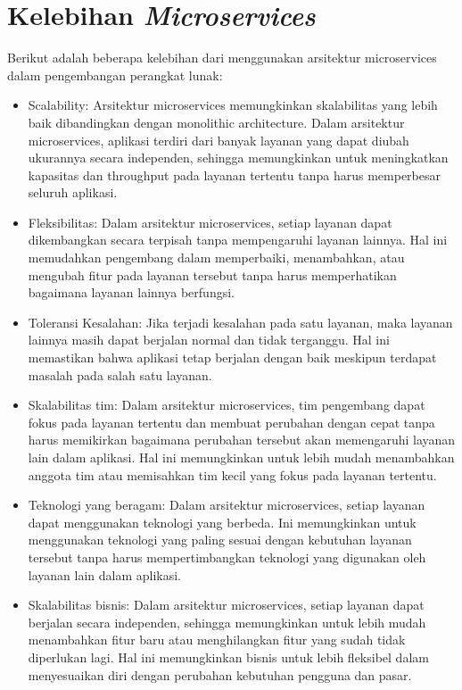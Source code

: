 	
	\section{Kelebihan \textit{Microservices}}
	Berikut adalah beberapa kelebihan dari menggunakan arsitektur microservices dalam pengembangan perangkat lunak:
	
	\begin{itemize}
		\item Scalability: Arsitektur microservices memungkinkan skalabilitas yang lebih baik dibandingkan dengan monolithic architecture. Dalam arsitektur microservices, aplikasi terdiri dari banyak layanan yang dapat diubah ukurannya secara independen, sehingga memungkinkan untuk meningkatkan kapasitas dan throughput pada layanan tertentu tanpa harus memperbesar seluruh aplikasi.
		\item Fleksibilitas: Dalam arsitektur microservices, setiap layanan dapat dikembangkan secara terpisah tanpa mempengaruhi layanan lainnya. Hal ini memudahkan pengembang dalam memperbaiki, menambahkan, atau mengubah fitur pada layanan tersebut tanpa harus memperhatikan bagaimana layanan lainnya berfungsi.
		\item Toleransi Kesalahan: Jika terjadi kesalahan pada satu layanan, maka layanan lainnya masih dapat berjalan normal dan tidak terganggu. Hal ini memastikan bahwa aplikasi tetap berjalan dengan baik meskipun terdapat masalah pada salah satu layanan.
		\item Skalabilitas tim: Dalam arsitektur microservices, tim pengembang dapat fokus pada layanan tertentu dan membuat perubahan dengan cepat tanpa harus memikirkan bagaimana perubahan tersebut akan memengaruhi layanan lain dalam aplikasi. Hal ini memungkinkan untuk lebih mudah menambahkan anggota tim atau memisahkan tim kecil yang fokus pada layanan tertentu.
		\item Teknologi yang beragam: Dalam arsitektur microservices, setiap layanan dapat menggunakan teknologi yang berbeda. Ini memungkinkan untuk menggunakan teknologi yang paling sesuai dengan kebutuhan layanan tersebut tanpa harus mempertimbangkan teknologi yang digunakan oleh layanan lain dalam aplikasi.
		\item Skalabilitas bisnis: Dalam arsitektur microservices, setiap layanan dapat berjalan secara independen, sehingga memungkinkan untuk lebih mudah menambahkan fitur baru atau menghilangkan fitur yang sudah tidak diperlukan lagi. Hal ini memungkinkan bisnis untuk lebih fleksibel dalam menyesuaikan diri dengan perubahan kebutuhan pengguna dan pasar.
	\end{itemize}
	
